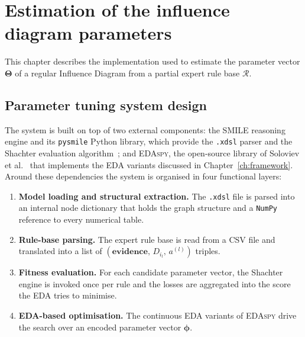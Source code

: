 
\chapter{Estimation of the influence diagram parameters}
\label{ch:implementation}

This chapter describes the implementation used to estimate the parameter vector $\boldsymbol{\Theta}$ of a regular
Influence Diagram from a partial expert rule base $\mathcal{R}$.

\section{Parameter tuning system design}
The system is built on top of two external components: the
\textsc{SMILE} reasoning engine and its \texttt{pysmile} Python library,
which provide the \texttt{.xdsl} parser and the Shachter evaluation
algorithm~\cite{shachter1986evaluating,genie}; and
\textsc{EDAspy}, the open-source library of Soloviev et al.~\cite{soloviev2024edaspy} that implements the EDA variants
discussed in Chapter~\ref{ch:framework}. Around these dependencies the
system is organised in four functional layers:

\begin{enumerate}
    \item \textbf{Model loading and structural extraction.}
          The \texttt{.xdsl} file is parsed into an internal node
          dictionary that holds the graph structure and a
          \texttt{NumPy} reference to every numerical table.
    \item \textbf{Rule-base parsing.}
          The expert rule base is read from a CSV file and translated
          into a list of $(\mathbf{evidence},\, D_{i_l},\, a^{(l)})$
          triples.
    \item \textbf{Fitness evaluation.}
          For each candidate parameter vector, the Shachter engine is
          invoked once per rule and the losses are aggregated
          into the score the EDA tries to minimise.
    \item \textbf{EDA-based optimisation.}
          The continuous EDA variants of \textsc{EDAspy} drive
          the search over an encoded parameter vector
          $\boldsymbol{\phi}$.
\end{enumerate}



